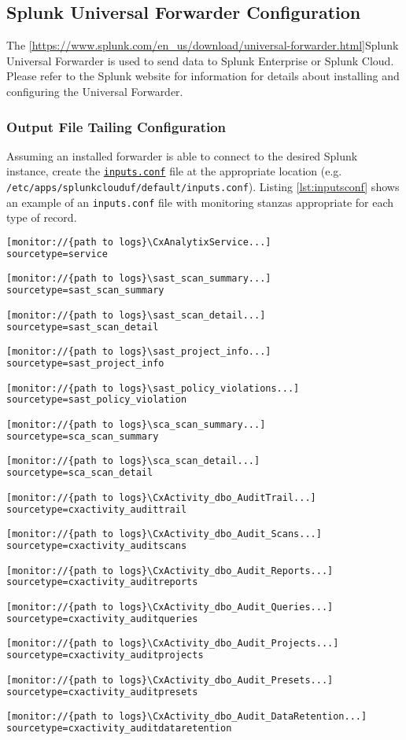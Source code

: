 \subsection{Splunk Universal Forwarder Configuration}
The \ref{https://www.splunk.com/en_us/download/universal-forwarder.html}{Splunk Universal Forwarder} is used to send data to Splunk Enterprise or Splunk Cloud.  
Please refer to the Splunk website for information for details about installing and configuring the Universal Forwarder.


\subsubsection{Output File Tailing Configuration}

Assuming an installed forwarder is able to connect to the desired Splunk instance, 
create the \href{https://docs.splunk.com/Documentation/Splunk/latest/Admin/Inputsconf}{\texttt{inputs.conf}} file at the appropriate location 
(e.g. \texttt{/etc/apps/splunkclouduf/default/inputs.conf}).  Listing \ref{lst:inputsconf} shows an example of an \texttt{inputs.conf}
file with monitoring stanzas appropriate for each type of record. 

\begin{lstlisting}[caption={Log4Net Record File Appenders}, label={lst:inputsconf}, language=XML]
[monitor://{path to logs}\CxAnalytixService...]
sourcetype=service

[monitor://{path to logs}\sast_scan_summary...]
sourcetype=sast_scan_summary

[monitor://{path to logs}\sast_scan_detail...]
sourcetype=sast_scan_detail

[monitor://{path to logs}\sast_project_info...]
sourcetype=sast_project_info

[monitor://{path to logs}\sast_policy_violations...]
sourcetype=sast_policy_violation

[monitor://{path to logs}\sca_scan_summary...]
sourcetype=sca_scan_summary

[monitor://{path to logs}\sca_scan_detail...]
sourcetype=sca_scan_detail

[monitor://{path to logs}\CxActivity_dbo_AuditTrail...]
sourcetype=cxactivity_audittrail

[monitor://{path to logs}\CxActivity_dbo_Audit_Scans...]
sourcetype=cxactivity_auditscans

[monitor://{path to logs}\CxActivity_dbo_Audit_Reports...]
sourcetype=cxactivity_auditreports

[monitor://{path to logs}\CxActivity_dbo_Audit_Queries...]
sourcetype=cxactivity_auditqueries

[monitor://{path to logs}\CxActivity_dbo_Audit_Projects...]
sourcetype=cxactivity_auditprojects

[monitor://{path to logs}\CxActivity_dbo_Audit_Presets...]
sourcetype=cxactivity_auditpresets

[monitor://{path to logs}\CxActivity_dbo_Audit_DataRetention...]
sourcetype=cxactivity_auditdataretention
\end{lstlisting}

